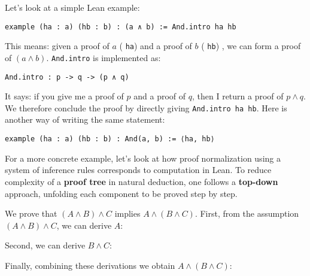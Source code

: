 \begin{example}\label{ex:conj_intro_2}
  Let's look at a simple Lean example:
  \begin{lstlisting}[language=lean]
    example (ha : a) (hb : b) : (a ∧ b) := And.intro ha hb
  \end{lstlisting}
  This means: given a proof of $a$ ( \lstinline[language=lean]|ha|)
  and a proof of $b$  ( \lstinline[language=lean]|hb|) ,
  we can form a proof of $(a \land b)$.
  \lstinline[language=lean]|And.intro| is implemented as:
  \begin{lstlisting}[language=lean]
    And.intro : p -> q -> (p ∧ q)
  \end{lstlisting}
  It says: if you give me a proof of $p$ and a proof of $q$,
  then I return a proof of $p \land q$.
  We therefore conclude the proof by directly giving
  \lstinline[language=lean]|And.intro ha hb|.
  Here is another way of writing the same statement:
  \begin{lstlisting}[language=lean]
    example (ha : a) (hb : b) : And(a, b) := ⟨ha, hb⟩
  \end{lstlisting}
\end{example}
For a more concrete example, let's look at how
proof normalization using a system of inference rules
corresponds to computation in Lean.
To reduce complexity of a \textbf{proof tree} in natural deduction,
one follows a
\textbf{top-down} approach,
unfolding each component to be proved step by step.
\begin{example}
  We prove that $(A \land B) \land C$ implies $A \land (B \land C)$.
  First, from the assumption $(A \land B) \land C$, we can derive $A$:
  \begin{prooftree}
  \end{prooftree}
  Second, we can derive $B \land C$:
  \begin{prooftree}
  \end{prooftree}
  Finally, combining these derivations we obtain $A \land (B \land C)$:
  \begin{prooftree}
  \end{prooftree}
\end{example}

